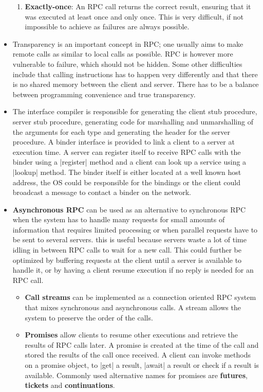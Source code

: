 \documentclass[a4paper]{article}
\begin{document}
\begin{itemize}
\begin{enumerate}
\item \textbf{Exactly-once}: An RPC call returns the correct result, ensuring that it was executed at least once and only once. This is very difficult, if not impossible to achieve as failures are always possible.
\end{enumerate}
\item Transparency is an important concept in RPC; one usually aims to make remote calls as similar to local calls as possible. RPC is however more vulnerable to failure, which should not be hidden. Some other difficulties include that calling instructions has to happen very differently and that there is no shared memory between the client and server. There has to be a balance between programming convenience and true transparency.
\item The interface compiler is responsible for generating the client stub procedure, server stub procedure, generating code for marshalling and unmarshalling of the arguments for each type and generating the header for the server procedure. A binder interface is provided to link a client to a server at execution time. A server can register itself to receive RPC calls with the binder using a |register| method and a client can look up a service using a |lookup| method. The binder itself is either located at a well known host address, the OS could be responsible for the bindings or the client could broadcast a message to contact a binder on the network.
\item \textbf{Asynchronous RPC} can be used as an alternative to synchronous RPC when the system has to handle many requests for small amounts of information that requires limited processing or when parallel requests have to be sent to several servers. this is useful because servers waste a lot of time idling in between RPC calls to wait for a new call. This could further be optimized by buffering requests at the client until a server is available to handle it, or by having a client resume execution if no reply is needed for an RPC call.
\begin{itemize}
\item \textbf{Call streams} can be implemented as a connection oriented RPC system that mixes synchronous and asynchronous calls. A stream allows the system to preserve the order of the calls.
\item \textbf{Promises} allow clients to resume other executions and retrieve the results of RPC calls later. A promise is created at the time of the call and stored the results of the call once received. A client can invoke methods on a promise object, to |get| a result, |await| a result or check if a result is available. Commonly used alternative names for promises are \textbf{futures}, \textbf{tickets} and \textbf{continuations}.
\end{itemize}
\end{itemize}
\end{document}
